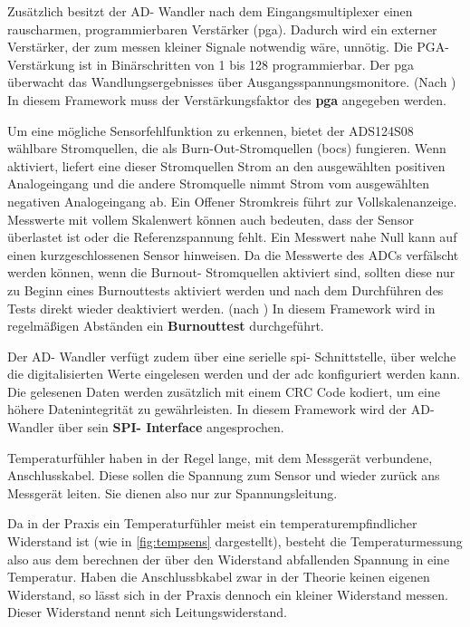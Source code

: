 Zusätzlich besitzt der AD- Wandler nach dem Eingangsmultiplexer einen rauscharmen, programmierbaren Verstärker (\ac{pga}). Dadurch wird ein externer Verstärker, der zum messen kleiner Signale notwendig wäre, unnötig.
Die PGA- Verstärkung ist in Binärschritten von 1 bis 128 programmierbar. Der \ac{pga} überwacht das Wandlungsergebnisses über Ausgangsspannungsmonitore. (Nach \textcite[][29]{TexasInstruments.2016})\newline
In diesem Framework muss der Verstärkungsfaktor des \textbf{\ac{pga}} angegeben werden.

Um eine mögliche Sensorfehlfunktion zu erkennen, bietet der ADS124S08 wählbare Stromquellen, die als Burn-Out-Stromquellen (\ac{bocs}) fungieren.
Wenn aktiviert, liefert eine dieser Stromquellen Strom an den ausgewählten positiven Analogeingang und die andere Stromquelle nimmt Strom vom ausgewählten negativen Analogeingang ab.
Ein Offener Stromkreis führt zur Vollskalenanzeige.
Messwerte mit vollem Skalenwert können auch bedeuten, dass der Sensor überlastet ist oder die Referenzspannung fehlt. 
Ein Messwert nahe Null kann auf einen kurzgeschlossenen Sensor hinweisen.\newline
Da die Messwerte des ADCs verfälscht werden können, wenn die Burnout- Stromquellen aktiviert sind, sollten diese nur zu Beginn eines Burnouttests aktiviert werden und nach dem Durchführen des Tests direkt wieder deaktiviert werden. (nach \textcite[][52]{TexasInstruments.2016})\newline
In diesem Framework wird in regelmäßigen Abständen ein \textbf{Burnouttest} durchgeführt.

Der AD- Wandler verfügt zudem über eine serielle \ac{spi}- Schnittstelle, über welche die digitalisierten Werte eingelesen werden und der \ac{adc} konfiguriert werden kann.
Die gelesenen Daten werden zusätzlich mit einem CRC Code kodiert, um eine höhere Datenintegrität zu gewährleisten.
In diesem Framework wird der AD- Wandler über sein \textbf{SPI- Interface} angesprochen.

Temperaturfühler haben in der Regel lange, mit dem Messgerät verbundene, Anschlusskabel.
Diese sollen die Spannung zum Sensor und wieder zurück ans Messgerät leiten.
Sie dienen also nur zur Spannungsleitung.

Da in der Praxis ein Temperaturfühler meist ein temperaturempfindlicher Widerstand ist (wie in \autoref{fig:tempsens} dargestellt), besteht die Temperaturmessung also aus dem berechnen der über den Widerstand abfallenden Spannung in eine Temperatur.
Haben die Anschlussbkabel zwar in der Theorie keinen eigenen Widerstand, so lässt sich in der Praxis dennoch ein kleiner Widerstand messen.
Dieser Widerstand nennt sich Leitungswiderstand.

